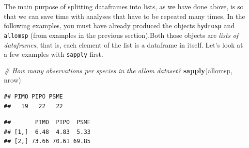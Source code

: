 \documentclass[]{book}
\newenvironment{Shaded}{\begin{snugshade}}{\end{snugshade}}
\newcommand{\CommentTok}[1]{\textcolor[rgb]{0.56,0.35,0.01}{\textit{#1}}}
\newcommand{\ControlFlowTok}[1]{\textcolor[rgb]{0.13,0.29,0.53}{\textbf{#1}}}
\newcommand{\KeywordTok}[1]{\textcolor[rgb]{0.13,0.29,0.53}{\textbf{#1}}}
\newcommand{\NormalTok}[1]{#1}
\newcommand{\OperatorTok}[1]{\textcolor[rgb]{0.81,0.36,0.00}{\textbf{#1}}}
\begin{document}
The main purpose of splitting dataframes into lists, as we have done above, is so that we can save time with analyses that have to be repeated many times. In the following examples, you must have already produced the objects \texttt{hydrosp} and \texttt{allomsp} (from examples in the previous section).Both those objects are \emph{lists of dataframes}, that is, each element of the list is a dataframe in itself. Let's look at a few examples with \texttt{sapply} first.

\begin{Shaded}
\begin{Highlighting}[]
\CommentTok{# How many observations per species in the allom dataset?}
\KeywordTok{sapply}\NormalTok{(allomsp, nrow)}
\end{Highlighting}
\end{Shaded}

\begin{verbatim}
## PIMO PIPO PSME 
##   19   22   22
\end{verbatim}

\begin{Shaded}
\end{Shaded}

\begin{verbatim}
##       PIMO  PIPO  PSME
## [1,]  6.48  4.83  5.33
## [2,] 73.66 70.61 69.85
\end{verbatim}

\begin{Shaded}
\end{Shaded}
\end{document}
